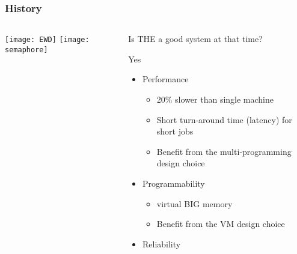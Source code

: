 \begin{frame}[plain]
	\frametitle{History}
	
	
	
	\begin{columns}
		
		\begin{column}{.4\textwidth}
			\centering
			\texttt{[image: EWD]}
			\texttt{[image: semaphore]}
			
			
			
		\end{column}
		
		\begin{column}{.6\textwidth}
			
			Is THE a good system at that time?
			
			Yes
			\begin{itemize}
				\item Performance
				
				\begin{itemize}
					\item 20\% slower than single machine
					\item Short turn‐around time (latency) for short jobs
					\item Benefit from the multi‐programming design choice
					
				\end{itemize}
				
				\item Programmability
				
				\begin{itemize}
					\item virtual BIG memory
					\item Benefit from the VM design choice
					
				\end{itemize}
			
			    \item Reliability
			\end{itemize}	
			
		\end{column}
		
		
	\end{columns}
	
	
\end{frame}


